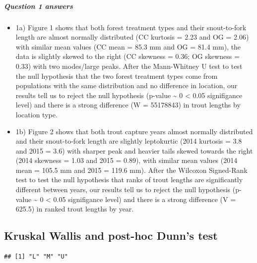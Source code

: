 \documentclass[
]{article}
\newenvironment{Shaded}{\begin{snugshade}}{\end{snugshade}}
\newcommand{\FunctionTok}[1]{\textcolor[rgb]{0.13,0.29,0.53}{\textbf{#1}}}
\newcommand{\NormalTok}[1]{#1}
\newcommand{\SpecialCharTok}[1]{\textcolor[rgb]{0.81,0.36,0.00}{\textbf{#1}}}
\providecommand{\tightlist}{%
  \setlength{\itemsep}{0pt}\setlength{\parskip}{0pt}}
\begin{document}
\subparagraph{Question 1 answers}\label{question-1-answers}

\begin{itemize}
\tightlist
\item
  1a) Figure 1 shows that both forest treatment types and their
  snout-to-fork length are almost normally distributed (CC kurtosis =
  2.23 and OG = 2.06) with similar mean values (CC mean = 85.3 mm and OG
  = 81.4 mm), the data is slightly skewed to the right (CC skewness =
  0.36; OG skewness = 0.33) with two modes/large peaks. After the
  Mann-Whitney U test to test the null hypothesis that the two forest
  treatment types come from populations with the same distribution and
  no difference in location, our results tell us to reject the null
  hypothesis (p-value \textasciitilde{} 0 \textless{} 0.05 signifigance
  level) and there is a strong difference (W = 55178843) in trout
  lengths by location type.
\item
  1b) Figure 2 shows that both trout capture years almost normally
  distributed and their snout-to-fork length are slightly leptokurtic
  (2014 kurtosis = 3.8 and 2015 = 3.6) with sharper peak and heavier
  tails skewed towards the right (2014 skewness = 1.03 and 2015 = 0.89),
  with similar mean values (2014 mean = 105.5 mm and 2015 = 119.6 mm).
  After the Wilcoxon Signed-Rank test to test the null hypothesis that
  ranks of trout lengths are significantly different between years, our
  results tell us to reject the null hypothesis (p-value
  \textasciitilde{} 0 \textless{} 0.05 signifigance level) and there is
  a strong difference (V = 625.5) in ranked trout lengths by year.
\end{itemize}

\subsection{Kruskal Wallis and post-hoc Dunn's
test}\label{kruskal-wallis-and-post-hoc-dunns-test}

\begin{Shaded}
\end{Shaded}

\begin{verbatim}
## [1] "L" "M" "U"
\end{verbatim}
\end{document}
